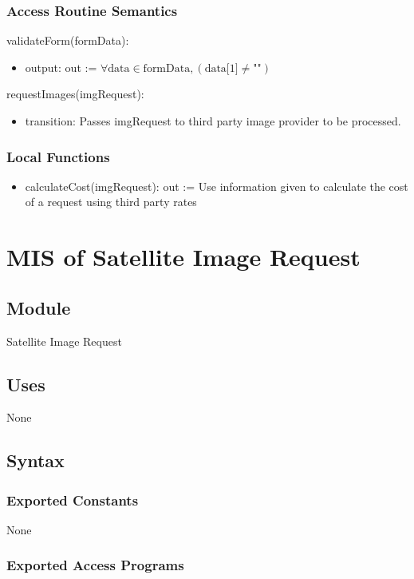 \documentclass[12pt, titlepage]{article}
\begin{document}
\subsubsection{Access Routine Semantics}

\noindent validateForm(formData):
\begin{itemize}
\item output: out := $\forall \text{data} \in \text{formData}, (\text{data[1]} \neq \text{""})$
\end{itemize}

\noindent requestImages(imgRequest):
\begin{itemize}
\item transition: Passes imgRequest to third party image provider to be processed.
\end{itemize}

\subsubsection{Local Functions}
\begin{itemize}
    \item calculateCost(imgRequest): out := Use information given to calculate the cost of a request using third party rates
\end{itemize}

\section{MIS of Satellite Image Request} \label{sir}

\subsection{Module}

Satellite Image Request

\subsection{Uses}
None

\subsection{Syntax}

\subsubsection{Exported Constants}
None
\subsubsection{Exported Access Programs}
\end{document}
